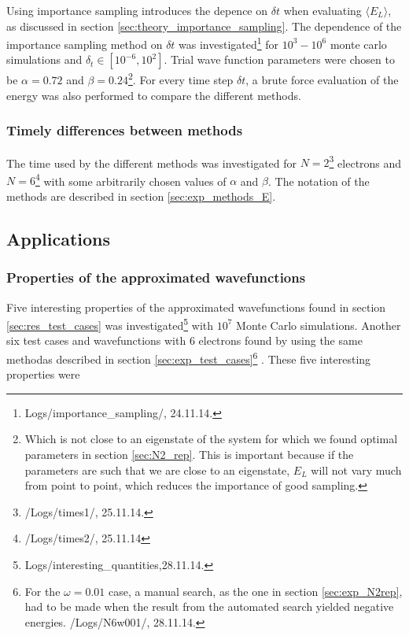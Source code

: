 Using importance sampling introduces the depence on $\delta t$ when evaluating $\langle E_L \rangle$, as discussed in section \ref{sec:theory_importance_sampling}.
The dependence of the importance sampling method on $\delta t$ was investigated\footnote{Logs/importance\_sampling/, 24.11.14.} 
for $10^3 - 10^6$ monte carlo simulations and $\delta_t \in [10^{-6}, 10^2]$. 
Trial wave function parameters were chosen to be $\alpha = 0.72$ and $\beta = 0.24$\footnote{Which is not close to an eigenstate of the system for which we found optimal parameters in section \ref{sec:N2_rep}. This is important because if the parameters are such that we are close to an eigenstate, $E_L$ will not vary much from point to point, which reduces the importance of good sampling.}.
For every time step $\delta t$, a brute force evaluation of the energy was also performed to compare the different methods. 


\subsubsection{Timely differences between methods}

The time used by the different methods was investigated for $N=2$\footnote{/Logs/times1/, 25.11.14.} electrons and 
$N=6$\footnote{/Logs/times2/, 25.11.14} with some arbitrarily chosen values of $\alpha$ and $\beta$. 
The notation of the methods are described in section \ref{sec:exp_methods_E}. 


















\subsection{Applications}

\subsubsection{Properties of the approximated wavefunctions}

Five interesting properties of the approximated wavefunctions found in section \ref{sec:res_test_cases} was investigated\footnote{Logs/interesting\_quantities,28.11.14.} with $10^7$ Monte Carlo simulations.
Another six test cases and wavefunctions with $6$ electrons found by using the same methodas described in section \ref{sec:exp_test_cases}\footnote{For the $\omega=0.01$ case, a manual search, as the one in section \ref{sec:exp_N2rep}, had to be made when the result from the automated search yielded negative energies. /Logs/N6w001/, 28.11.14.} .
These five interesting properties were

